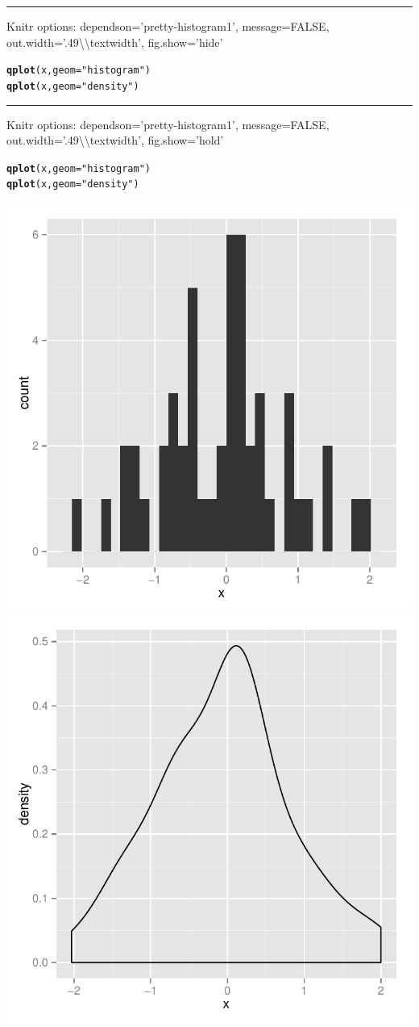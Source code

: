 \documentclass{article}\usepackage[]{graphicx}\usepackage[]{color}
\makeatletter
\newcommand{\hlstr}[1]{\textcolor[rgb]{0.192,0.494,0.8}{#1}}%
\newcommand{\hlstd}[1]{\textcolor[rgb]{0.345,0.345,0.345}{#1}}%
\newcommand{\hlkwc}[1]{\textcolor[rgb]{0.333,0.667,0.333}{#1}}%
\newcommand{\hlkwd}[1]{\textcolor[rgb]{0.737,0.353,0.396}{\textbf{#1}}}%
\newenvironment{kframe}{%
 \def\at@end@of@kframe{}%
 \ifinner\ifhmode%
  \def\at@end@of@kframe{\end{minipage}}%
  \begin{minipage}{\columnwidth}%
 \fi\fi%
 \def\FrameCommand##1{\hskip\@totalleftmargin \hskip-\fboxsep
 \colorbox{shadecolor}{##1}\hskip-\fboxsep
     \hskip-\linewidth \hskip-\@totalleftmargin \hskip\columnwidth}%
 \MakeFramed {\advance\hsize-\width
   \@totalleftmargin\z@ \linewidth\hsize
   \@setminipage}}%
 {\par\unskip\endMakeFramed%
 \at@end@of@kframe}
\newenvironment{knitrout}{}{} %
\makeatother
\begin{document}
\hrule\vspace{12pt}
\noindent Knitr options: dependson='pretty-histogram1', message=FALSE, out.width='.49\textbackslash\textbackslash textwidth', fig.show='hide'
\begin{knitrout}
\color{fgcolor}\begin{kframe}
\begin{alltt}
\hlkwd{qplot}\hlstd{(x,} \hlkwc{geom} \hlstd{=} \hlstr{"histogram"}\hlstd{)}
\hlkwd{qplot}\hlstd{(x,} \hlkwc{geom} \hlstd{=} \hlstr{"density"}\hlstd{)}
\end{alltt}
\end{kframe}
\end{knitrout}

\hrule\vspace{12pt}
\noindent Knitr options: dependson='pretty-histogram1', message=FALSE, out.width='.49\textbackslash\textbackslash textwidth', fig.show='hold'

\begin{knitrout}
\color{fgcolor}\begin{kframe}
\begin{alltt}
\hlkwd{qplot}\hlstd{(x,} \hlkwc{geom} \hlstd{=} \hlstr{"histogram"}\hlstd{)}
\hlkwd{qplot}\hlstd{(x,} \hlkwc{geom} \hlstd{=} \hlstr{"density"}\hlstd{)}
\end{alltt}
\end{kframe}

{\centering \includegraphics[width=.49\textwidth]{figure/lots-of-plots31} 
\includegraphics[width=.49\textwidth]{figure/lots-of-plots32} 

}



\end{knitrout}
\end{document}
